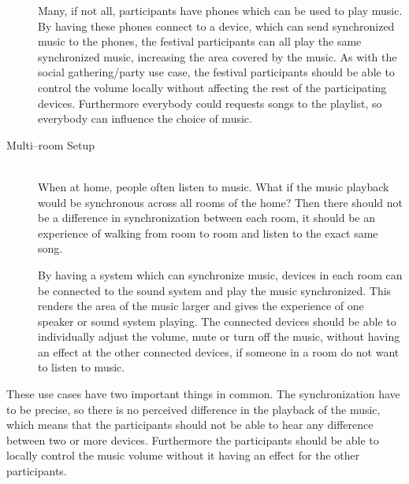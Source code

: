 \begin{description}
        Many, if not all, participants have phones which can be used to play music.
        By having these phones connect to a device, which can send synchronized music to the phones,
        the festival participants can all play the same synchronized music,
        increasing the area covered by the music.
        As with the social gathering/party use case,
        the festival participants should be able to control the volume locally without affecting the rest of the participating devices.
        Furthermore everybody could requests songs to the playlist, so everybody can influence the choice of music.

    \item[Multi--room Setup] \hfill\\
        When at home, people often listen to music.
        What if the music playback would be synchronous across all rooms of the home?
        Then there should not be a difference in synchronization between each room,
        it should be an experience of walking from room to room and listen to the exact same song.

        By having a system which can synchronize music, devices in each room can be connected to the sound system and play the music synchronized.
        This renders the area of the music larger and gives the experience of one speaker or sound system playing.
        The connected devices should be able to individually adjust the volume, mute or turn off the music,
        without having an effect at the other connected devices, if someone in a room do not want to listen to music. 
\end{description}

These use cases have two important things in common.
The synchronization have to be precise, so there is no perceived difference in the playback of the music,
which means that the participants should not be able to hear any difference between two or more devices.
Furthermore the participants should be able to locally control the music volume without it having an effect for the other participants.
